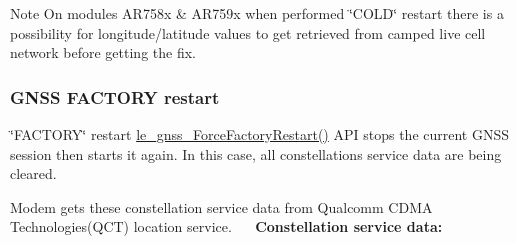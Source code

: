 \begin{DoxyNote}{Note}
On modules A\+R758x \& A\+R759x when performed \char`\"{}\+C\+O\+L\+D\char`\"{} restart there is a possibility for longitude/latitude values to get retrieved from camped live cell network before getting the fix.
\end{DoxyNote}
\hypertarget{platformConstraintsGnss_platformConstraintsGnss_FactoryRestart}{}\subsubsection{G\+N\+S\+S F\+A\+C\+T\+O\+R\+Y restart}\label{platformConstraintsGnss_platformConstraintsGnss_FactoryRestart}
\char`\"{}\+F\+A\+C\+T\+O\+R\+Y\char`\"{} restart \hyperlink{le__gnss__interface_8h_a18219097f3e8c8e6e613462a5467f546}{le\+\_\+gnss\+\_\+\+Force\+Factory\+Restart()} A\+PI stops the current G\+N\+SS session then starts it again. In this case, all constellation\textquotesingle{}s service data are being cleared.

Modem gets these constellation service data from Qualcomm C\+D\+MA Technologies(\+Q\+C\+T) location service.~\newline
~\newline
 {\bfseries Constellation service data\+:}~\newline

